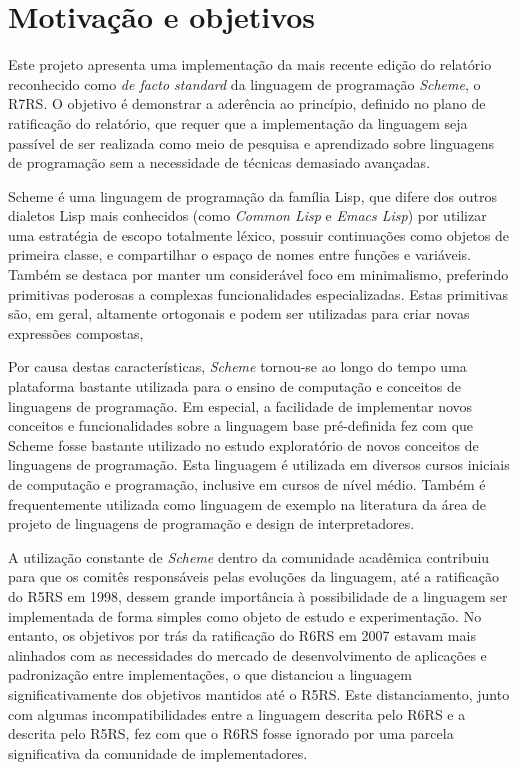 \section{Motivação e objetivos}
\label{sec:motivacao}

Este projeto apresenta uma implementação da mais recente edição do relatório
reconhecido como \textit{de facto standard} da linguagem de programação
\textit{Scheme}, o \acs{R7RS}. O objetivo é demonstrar a aderência ao
princípio, definido no plano de ratificação do relatório, que requer que a
implementação da linguagem seja passível de ser realizada como meio de pesquisa
e aprendizado sobre linguagens de programação sem a necessidade de técnicas
demasiado avançadas\cite{wg1-charter}.

Scheme é uma linguagem de programação da família Lisp, que difere dos outros
dialetos Lisp  mais conhecidos (como \textit{Common Lisp} e \textit{Emacs
Lisp}) por utilizar uma estratégia de escopo totalmente léxico, possuir
continuações como objetos de primeira classe, e compartilhar o espaço de nomes
entre funções e variáveis. Também se destaca por manter um considerável foco em
minimalismo, preferindo primitivas poderosas a complexas funcionalidades
especializadas\cite{first-report}. Estas primitivas são, em geral, altamente ortogonais e podem
ser utilizadas para criar novas expressões compostas,

Por causa destas características, \textit{Scheme} tornou-se ao longo do tempo
uma plataforma bastante utilizada para o ensino de computação e conceitos de
linguagens de programação. Em especial, a facilidade de implementar novos
conceitos e funcionalidades sobre a linguagem base pré-definida fez com que
Scheme fosse bastante utilizado no estudo exploratório de novos conceitos de
linguagens de programação. Esta linguagem é utilizada em diversos cursos
iniciais de computação e programação, inclusive em cursos de nível
médio\cite{sicp}\cite{htdp}\cite{scheme-schools}. Também é frequentemente utilizada como linguagem de exemplo na
literatura da área de projeto de linguagens de programação e design de
interpretadores\cite{plai}\cite{eopl}.


A utilização constante de \textit{Scheme} dentro da comunidade acadêmica
contribuiu para que os comitês responsáveis pelas evoluções da linguagem, até a
ratificação do \acs{R5RS} em 1998, dessem grande importância à possibilidade de
a linguagem ser implementada de forma simples como objeto de estudo e
experimentação. No entanto, os objetivos por trás da ratificação do \acs{R6RS}
em 2007 estavam mais alinhados com as necessidades do mercado de
desenvolvimento de aplicações e padronização entre implementações, o que
distanciou a linguagem significativamente dos objetivos mantidos até o
\acs{R5RS}. Este distanciamento, junto com algumas incompatibilidades entre a
linguagem descrita pelo \acs{R6RS} e a descrita pelo \acs{R5RS}, fez com que o
\acs{R6RS} fosse ignorado por uma parcela significativa da comunidade de 
implementadores\cite{r6rs-controversy}.

